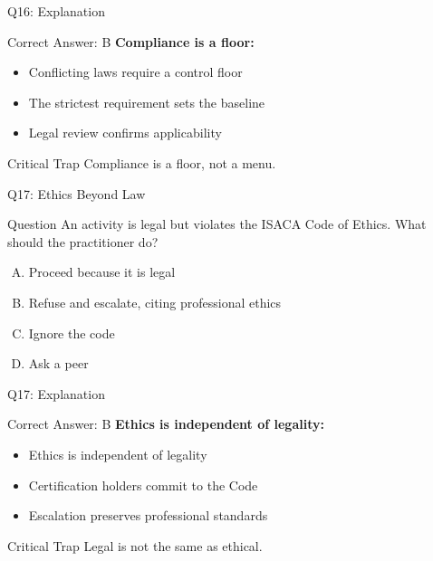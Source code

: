 \documentclass{beamer}
\begin{document}
	\begin{frame}{Q16: Explanation}
		\begin{block}{Correct Answer: B}
			\textbf{Compliance is a floor:}
			\begin{itemize}
				\item Conflicting laws require a control floor
				\item The strictest requirement sets the baseline
				\item Legal review confirms applicability
			\end{itemize}
		\end{block}
		\begin{alertblock}{Critical Trap}
			Compliance is a floor, not a menu.
		\end{alertblock}
	\end{frame}
	
	\begin{frame}{Q17: Ethics Beyond Law}
		\begin{block}{Question}
			An activity is legal but violates the ISACA Code of Ethics. What should the practitioner do?
		\end{block}
		\begin{enumerate}[(A)]
			\item Proceed because it is legal
			\item Refuse and escalate, citing professional ethics
			\item Ignore the code
			\item Ask a peer
		\end{enumerate}
	\end{frame}
	
	\begin{frame}{Q17: Explanation}
		\begin{block}{Correct Answer: B}
			\textbf{Ethics is independent of legality:}
			\begin{itemize}
				\item Ethics is independent of legality
				\item Certification holders commit to the Code
				\item Escalation preserves professional standards
			\end{itemize}
		\end{block}
		\begin{alertblock}{Critical Trap}
			Legal is not the same as ethical.
		\end{alertblock}
	\end{frame}
	
\end{document}
